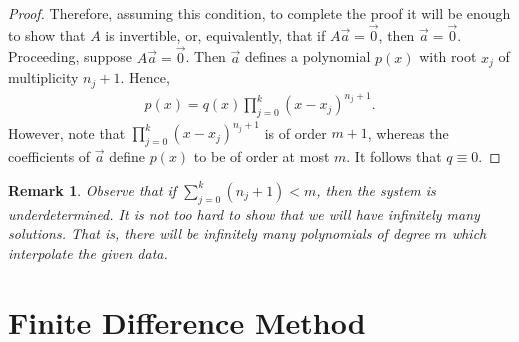 \documentclass[12pt,reqno]{amsart}
\numberwithin{equation}{section}  %
\newtheorem{remark}[theorem]{Remark}
\begin{document}
\begin{proof}
Therefore, assuming this condition, to complete
the proof it will be enough to show that $A$ is invertible, or, equivalently,
that if $A \vec{a}=\vec{0}$, then $\vec{a} = \vec{0}$. Proceeding, suppose
$A \vec{a}=\vec{0}$. Then $\vec{a}$ defines a polynomial $p(x)$ with root $x_j$ of
multiplicity $n_j +1$. Hence,
\begin{equation*}
\begin{split}
p(x) = q(x) \prod_{j=0}^{k}(x-x_{j})^{n_{j}+1}.
\end{split}
\end{equation*}
However, note that $\prod_{j=0}^{k}(x-x_{j})^{n_{j}+1}$ is of order $m+1$,
whereas the coefficients of $\vec{a}$ define $p(x)$ to be of order at most $m$.
It follows that $q \equiv 0$. 
\end{proof}
\begin{remark}
Observe that if $\sum_{j=0}^{k}(n_j + 1) < m$, then the system is underdetermined.
It is not too hard to show that we will have infinitely many solutions. That is, there will be infinitely
many polynomials of degree $m$ which interpolate the given data.
\end{remark}
\section{Finite Difference Method}
\end{document}
